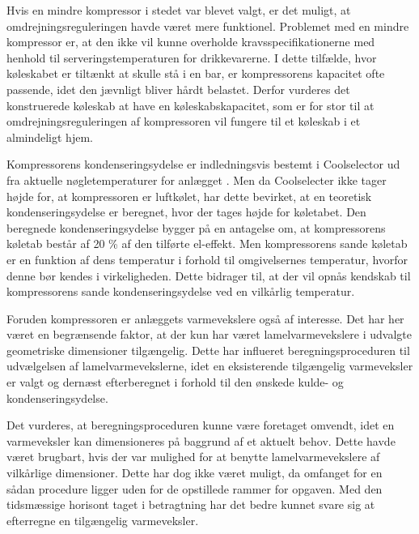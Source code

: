 \documentclass[../Hovedrapport.tex]{subfiles}
\begin{document}
Hvis en mindre kompressor i stedet var blevet valgt, er det muligt, at omdrejningsreguleringen havde været mere funktionel. Problemet med en mindre kompressor er, at den ikke vil kunne overholde kravsspecifikationerne med henhold til serveringstemperaturen for drikkevarerne. I dette tilfælde, hvor køleskabet er tiltænkt at skulle stå i en bar, er kompressorens kapacitet ofte passende, idet den jævnligt bliver hårdt belastet. Derfor vurderes det konstruerede køleskab at have en køleskabskapacitet, som er for stor til at omdrejningsreguleringen af kompressoren vil fungere til et køleskab i et almindeligt hjem.  

Kompressorens kondenseringsydelse er indledningsvis bestemt i Coolselector ud fra aktuelle nøgletemperaturer for anlægget \citep{Coolselector}. Men da Coolselecter ikke tager højde for, at kompressoren er luftkølet, har dette bevirket, at en teoretisk kondenseringsydelse er beregnet, hvor der tages højde for køletabet. Den beregnede kondenseringsydelse bygger på en antagelse om, at kompressorens køletab består af 20 \% af den tilførte el-effekt. Men kompressorens sande køletab er en funktion af dens temperatur i forhold til omgivelsernes temperatur, hvorfor denne bør kendes i virkeligheden. Dette bidrager til, at der vil opnås kendskab til kompressorens sande kondenseringsydelse ved en vilkårlig temperatur.


Foruden kompressoren er anlæggets varmevekslere også af interesse. Det har her været en begrænsende faktor, at der kun har været lamelvarmevekslere i udvalgte geometriske dimensioner tilgængelig. Dette har influeret beregningsproceduren til udvælgelsen af lamelvarmevekslerne, idet en eksisterende tilgængelig varmeveksler er valgt og dernæst efterberegnet i forhold til den ønskede kulde- og kondenseringsydelse. 

Det vurderes, at beregningsproceduren kunne være foretaget omvendt, idet en varmeveksler kan dimensioneres på baggrund af et aktuelt behov. Dette havde været brugbart, hvis der var mulighed for at benytte lamelvarmevekslere af vilkårlige dimensioner. Dette har dog ikke været muligt, da omfanget for en sådan procedure ligger uden for de opstillede rammer for opgaven. Med den tidsmæssige horisont taget i betragtning har det bedre kunnet svare sig at efterregne en tilgængelig varmeveksler.
\end{document}
